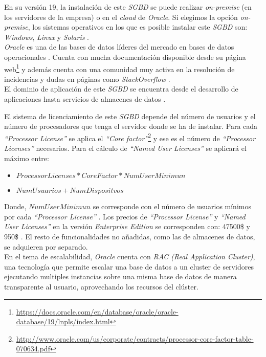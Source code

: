 \documentclass[3pt]{article}
\begin{document}
En su versión 19, la instalación de este \emph{SGBD} se puede realizar \emph{on-premise} (en los servidores de la empresa) o en el \emph{cloud} de \emph{Oracle}. Si elegimos la opción \emph{on-premise}, los sistemas operativos en los que es posible instalar este \emph{SGBD} son: \emph{Windows}, \emph{Linux} y \emph{Solaris} \cite{ORA:1}.\\

\emph{Oracle} es una de las bases de datos líderes del mercado en bases de datos operacionales \cite{GART:1}. Cuenta con mucha documentación disponible desde su página web\footnote{\url{https://docs.oracle.com/en/database/oracle/oracle-database/19/lnpls/index.html}} y además cuenta con una comunidad muy activa en la resolución de incidencias y dudas en páginas como \emph{StackOverflow} \cite{STO:1}.\\

El dominio de aplicación de este \emph{SGBD} se encuentra desde el desarrollo de aplicaciones hasta servicios de almacenes de datos \cite{ORA:2}.

El sistema de licenciamiento de este \emph{SGBD} depende del número de usuarios y el número de procesadores que tenga el servidor donde se ha de instalar. Para cada \emph{``Processor License''} se aplica el \emph{``Core factor''}\footnote{\url{http://www.oracle.com/us/corporate/contracts/processor-core-factor-table-070634.pdf}} y ese es el número de \emph{``Processor Licenses''} necesarios. Para el cálculo de \emph{``Named User Licenses''} se aplicará el máximo entre:

\begin{itemize}
\item $ProcessorLicenses * CoreFactor * NumUserMinimun$
\item $NumUsuarios + NumDispositvos$
\end{itemize}

Donde, $NumUserMinimun$ se corresponde con el número de usuarios mínimos por cada \emph{``Processor License''} \cite{ORA:3}. Los precios de \emph{``Processor License''} y \emph{``Named User Licenses''} en la versión \emph{Enterprise Edition} se corresponden con: 47500\$ y 950\$ \cite{ORA:4}. El resto de funcionalidades no añadidas, como las de almacenes de datos, se adquieren por separado. \\

En el tema de escalabilidad, \emph{Oracle} cuenta con \emph{RAC (Real Application Cluster)}, una tecnología que permite escalar una base de datos a un cluster de servidores ejecutando multiples instancias sobre una misma base de datos de manera transparente al usuario, aprovechando los recursos del clúster. \cite{ORA:5} \\
\end{document}
